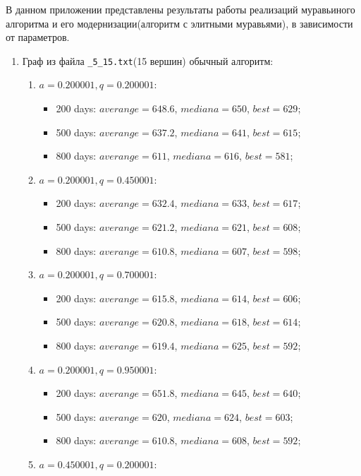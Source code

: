 	
В данном приложении представлены результаты работы реализаций муравьиного алгоритма и его модернизации(алгоритм с элитными муравьями), в зависимости от параметров. \label{add}
\begin{enumerate}
	\item Граф из файла \texttt{\_5\_15.txt}(15 вершин) обычный алгоритм:
	\begin{enumerate}
		\item $a= 0.200001, q= 0.200001$:
		\begin{itemize}
			\item 200 days: $averange =  648.6$, $mediana =  650$, $best = 629$;
			\item 500 days: $averange =  637.2$, $mediana =  641$, $best = 615$;
			\item 800 days: $averange =  611$, $mediana =  616$, $best = 581$;
		\end{itemize}
		\item $a= 0.200001, q= 0.450001$:
		\begin{itemize}
			\item 200 days: $averange =  632.4$, $mediana =  633$, $best = 617$;
			\item 500 days: $averange =  621.2$, $mediana =  621$, $best = 608$;
			\item 800 days: $averange =  610.8$, $mediana =  607$, $best = 598$;
		\end{itemize}
		\item $a= 0.200001, q= 0.700001$:
		\begin{itemize}
			\item 200 days: $averange =  615.8$, $mediana =  614$, $best = 606$;
			\item 500 days: $averange =  620.8$, $mediana =  618$, $best = 614$;
			\item 800 days: $averange =  619.4$, $mediana =  625$, $best = 592$;
		\end{itemize}
		\item $a= 0.200001, q= 0.950001$:
		\begin{itemize}
			\item 200 days: $averange =  651.8$, $mediana =  645$, $best = 640$;
			\item 500 days: $averange =  620$, $mediana =  624$, $best = 603$;
			\item 800 days: $averange =  610.8$, $mediana =  608$, $best = 592$;
		\end{itemize}
		\item $a= 0.450001, q= 0.200001$:

\end{enumerate}
\end{enumerate}
